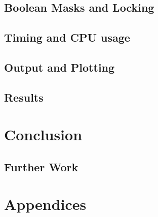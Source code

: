 \documentclass[12pt, a4paper]{article}
\begin{document}
\subsection{Boolean Masks and Locking}
%

\subsection{Timing and CPU usage}

\subsection{Output and Plotting}
%

\subsection{Results}

\section{Conclusion}

\subsection{Further Work}



\appendix
\section{Appendices}
\end{document}
